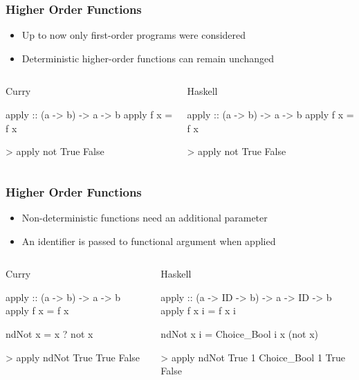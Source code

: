 \documentclass[utf8,handout]{beamer}
\begin{document}
\begin{frame}[fragile]
\frametitle{Higher Order Functions}
\begin{itemize}
\item Up to now only first-order programs were considered
\item Deterministic higher-order functions can remain unchanged
\end{itemize}
\begin{columns}
\begin{block}{Curry}
\begin{semiverbatim}
apply :: (a -> b) -> a -> b
apply f x = f x

> apply not True
False
\end{semiverbatim}
\end{block}
\begin{block}{Haskell}
\begin{semiverbatim}
apply :: (a -> b) -> a -> b
apply f x = f x

> apply not True
False
\end{semiverbatim}
\end{block}
\end{columns}
\end{frame}


\begin{frame}[fragile]
\frametitle{Higher Order Functions}
\begin{itemize}
\item Non-deterministic functions need an additional parameter
\item An identifier is passed to functional argument when applied
\end{itemize}
\begin{columns}
\begin{block}{Curry}
\begin{semiverbatim}
apply :: (a -> b) -> a -> b
apply f x = f x

ndNot x = x ? not x

> apply ndNot True
True
False
\end{semiverbatim}
\end{block}
\begin{block}{Haskell}
\begin{semiverbatim}
apply :: (a -> ID -> b) 
      -> a -> ID -> b
apply f x i = f x i

ndNot x i = 
  Choice_Bool i x (not x)

> apply ndNot True 1
Choice_Bool 1 True False
\end{semiverbatim}
\end{block}
\end{columns}
\end{frame}
\end{document}
